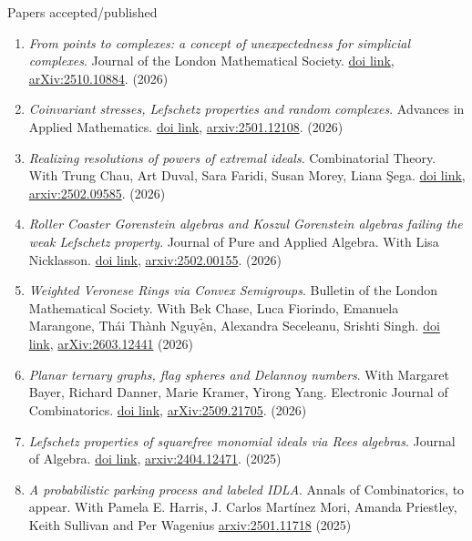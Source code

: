 \documentclass[12pt]{resume} %
\begin{document}
\begin{rSection}{Papers accepted/published}
    \begin{enumerate}
        \item \textit{From points to complexes: a concept of unexpectedness for simplicial complexes}. Journal of the London Mathematical Society. \href{http://dx.doi.org/10.1112/jlms.70632}{doi link}, \href{https://arxiv.org/abs/2510.10884}{arXiv:2510.10884}. (2026)
        \item \textit{Coinvariant stresses, Lefschetz properties and random complexes}. Advances in Applied Mathematics. \href{https://doi.org/10.1016/j.aam.2026.103097}{doi link}, \href{https://arxiv.org/abs/2501.12108}{arxiv:2501.12108}. (2026)
        \item \textit{Realizing resolutions of powers of extremal ideals}. Combinatorial Theory. With Trung Chau, Art Duval, Sara Faridi, Susan Morey, Liana \c{S}ega. \href{https://doi.org/10.5070/C6.69925}{doi link}, \href{https://arxiv.org/abs/2502.09585}{arxiv:2502.09585}. (2026)
        \item \textit{Roller Coaster Gorenstein algebras and Koszul Gorenstein algebras failing the weak Lefschetz property}. Journal of Pure and Applied Algebra. With Lisa Nicklasson. \href{https://doi.org/10.1016/j.jpaa.2026.108238}{doi link}, \href{https://arxiv.org/abs/2502.00155}{arxiv:2502.00155}. (2026)
        \item \textit{Weighted Veronese Rings via Convex Semigroups}. Bulletin of the London Mathematical Society. With Bek Chase, Luca Fiorindo, Emanuela Marangone, Thái Thành Nguy$\tilde{\mbox{\^e}}$n, Alexandra Seceleanu, Srishti Singh. \href{https://doi.org/10.1112/blms.70536}{doi link},  \href{https://arxiv.org/abs/2603.12441}{arXiv:2603.12441} (2026) 
        \item \textit{Planar ternary graphs, flag spheres and Delannoy numbers}. With Margaret Bayer, Richard Danner, Marie Kramer, Yirong Yang. Electronic Journal of Combinatorics. \href{https://doi.org/10.37236/14802}{doi link}, \href{https://arxiv.org/abs/2509.21705}{arXiv:2509.21705}. (2026) 
        \item \textit{Lefschetz properties of squarefree monomial ideals via Rees algebras}. Journal of Algebra. \href{https://doi.org/10.1016/j.jalgebra.2024.12.030}{doi link}, \href{https://arxiv.org/abs/2404.12471}{arxiv:2404.12471}. (2025)
        \item \textit{A probabilistic parking process and labeled IDLA}. Annals of Combinatorics, to appear. With Pamela E. Harris, J. Carlos Martínez Mori, Amanda Priestley, Keith Sullivan and Per Wagenius  \href{https://arxiv.org/abs/2501.11718}{arxiv:2501.11718} (2025)

\end{enumerate}
\end{rSection}
\end{document}
